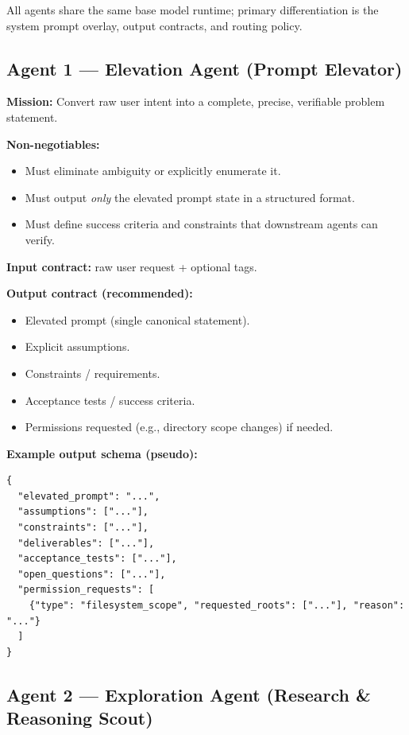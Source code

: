 \documentclass[11pt]{article}
\begin{document}
All agents share the same base model runtime; primary differentiation is the system prompt overlay, output contracts, and routing policy.

\subsection{Agent 1 --- Elevation Agent (Prompt Elevator)}

\textbf{Mission:} Convert raw user intent into a complete, precise, verifiable problem statement.

\textbf{Non-negotiables:}
\begin{itemize}
  \item Must eliminate ambiguity or explicitly enumerate it.
  \item Must output \emph{only} the elevated prompt state in a structured format.
  \item Must define success criteria and constraints that downstream agents can verify.
\end{itemize}

\textbf{Input contract:} raw user request + optional tags.

\textbf{Output contract (recommended):}
\begin{itemize}
  \item Elevated prompt (single canonical statement).
  \item Explicit assumptions.
  \item Constraints / requirements.
  \item Acceptance tests / success criteria.
  \item Permissions requested (e.g., directory scope changes) if needed.
\end{itemize}

\textbf{Example output schema (pseudo):}
\begin{lstlisting}[style=json, caption={Agent 1 output contract (schema sketch)}]
{
  "elevated_prompt": "...",
  "assumptions": ["..."],
  "constraints": ["..."],
  "deliverables": ["..."],
  "acceptance_tests": ["..."],
  "open_questions": ["..."],
  "permission_requests": [
    {"type": "filesystem_scope", "requested_roots": ["..."], "reason": "..."}
  ]
}
\end{lstlisting}

\subsection{Agent 2 --- Exploration Agent (Research \& Reasoning Scout)}
\end{document}
